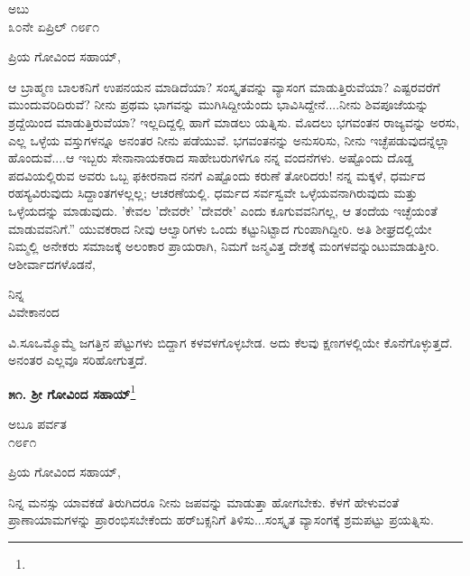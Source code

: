 \vspace{-0.5cm}

\begin{flushright}
ಅಬು\\೩೦ನೇ ಏಪ್ರಿಲ್ ೧೮೯೧
\end{flushright}

\noindent
ಪ್ರಿಯ ಗೋವಿಂದ ಸಹಾಯ್,

ಆ ಬ್ರಾಹ್ಮಣ ಬಾಲಕನಿಗೆ ಉಪನಯನ ಮಾಡಿದೆಯಾ? ಸಂಸ್ಕೃತವನ್ನು ವ್ಯಾಸಂಗ ಮಾಡುತ್ತಿರುವೆಯಾ? ಎಷ್ಟರವರೆಗೆ ಮುಂದುವರಿದಿರುವೆ? ನೀನು ಪ್ರಥಮ ಭಾಗವನ್ನು ಮುಗಿಸಿದ್ದೀಯೆಂದು ಭಾವಿಸಿದ್ದೇನೆ....ನೀನು ಶಿವಪೂಜೆಯನ್ನು ಶ್ರದ್ದೆಯಿಂದ ಮಾಡುತ್ತಿರುವೆಯಾ? ಇಲ್ಲದಿದ್ದಲ್ಲಿ ಹಾಗೆ ಮಾಡಲು ಯತ್ನಿಸು. ಮೊದಲು ಭಗವಂತನ ರಾಜ್ಯವನ್ನು ಅರಸು, ಎಲ್ಲ ಒಳ್ಳೆಯ ವಸ್ತುಗಳನ್ನೂ ಅನಂತರ ನೀನು ಪಡೆಯುವೆ. ಭಗವಂತನನ್ನು ಅನುಸರಿಸು, ನೀನು ಇಚ್ಛೆಪಡುವುದನ್ನೆಲ್ಲಾ ಹೊಂದುವೆ....ಆ ಇಬ್ಬರು ಸೇನಾನಾಯಕರಾದ ಸಾಹೇಬರುಗಳಿಗೂ ನನ್ನ ವಂದನೆಗಳು. ಅಷ್ಟೊಂದು ದೊಡ್ಡ ಪದವಿಯಲ್ಲಿರುವ ಅವರು ಒಬ್ಬ ಫಕೀರನಾದ ನನಗೆ ಎಷ್ಟೊಂದು ಕರುಣೆ ತೋರಿದರು! ನನ್ನ ಮಕ್ಕಳೆ, ಧರ್ಮದ ರಹಸ್ಯವಿರುವುದು ಸಿದ್ದಾಂತಗಳಲ್ಲಲ್ಲ; ಆಚರಣೆಯಲ್ಲಿ. ಧರ್ಮದ ಸರ್ವಸ್ವವೇ ಒಳ್ಳೆಯವನಾಗಿರುವುದು ಮತ್ತು ಒಳ್ಳೆಯದನ್ನು ಮಾಡುವುದು. 'ಕೇವಲ 'ದೇವರೇ' 'ದೇವರೇ' ಎಂದು ಕೂಗುವವನಿಗಲ್ಲ, ಆ ತಂದೆಯ ಇಚ್ಛೆಯಂತೆ ಮಾಡುವವನಿಗೆ.” ಯುವಕರಾದ ನೀವು ಆಲ್ವಾರಿಗಳು ಒಂದು ಕಟ್ಟುನಿಟ್ಟಾದ ಗುಂಪಾಗಿದ್ದೀರಿ. ಅತಿ ಶೀಘ್ರದಲ್ಲಿಯೇ ನಿಮ್ಮಲ್ಲಿ ಅನೇಕರು ಸಮಾಜಕ್ಕೆ ಅಲಂಕಾರ ಪ್ರಾಯರಾಗಿ, ನಿಮಗೆ ಜನ್ಮವಿತ್ತ ದೇಶಕ್ಕೆ ಮಂಗಳವನ್ನುಂಟುಮಾಡುತ್ತೀರಿ. ಆಶೀರ್ವಾದಗಳೊಡನೆ,

\vspace{-0.5cm}

{\flushright
ನಿನ್ನ\\ವಿವೇಕಾನಂದ\par}

ವಿ.ಸೂ\enginline{-}ಒಮ್ಮೊಮ್ಮೆ ಜಗತ್ತಿನ ಪೆಟ್ಟುಗಳು ಬಿದ್ದಾಗ ಕಳವಳಗೊಳ್ಳಬೇಡ. ಅದು ಕೆಲವು ಕ್ಷಣಗಳಲ್ಲಿಯೇ ಕೊನೆಗೊಳ್ಳುತ್ತದೆ. ಅನಂತರ ಎಲ್ಲವೂ ಸರಿಹೋಗುತ್ತದೆ.

\begin{center}
\textbf{೫೧. ಶ‍್ರೀ ಗೋವಿಂದ ಸಹಾಯ್}\footnote{}
\end{center}

\vspace{-0.65cm}

\begin{flushright}
ಅಬೂ ಪರ್ವತ\\೧೮೯೧
\end{flushright}

\vspace{-0.55cm}

\noindent
ಪ್ರಿಯ ಗೋವಿಂದ ಸಹಾಯ್,

ನಿನ್ನ ಮನಸ್ಸು ಯಾವಕಡೆ ತಿರುಗಿದರೂ ನೀನು ಜಪವನ್ನು ಮಾಡುತ್ತಾ ಹೋಗಬೇಕು. ಕೆಳಗೆ ಹೇಳುವಂತೆ ಪ್ರಾಣಾಯಾಮಗಳನ್ನು ಪ್ರಾರಂಭಿಸಬೇಕೆಂದು ಹರ್‌ಬಕ್ಸನಿಗೆ ತಿಳಿಸು...ಸಂಸ್ಕೃತ ವ್ಯಾಸಂಗಕ್ಕೆ ಶ್ರಮಪಟ್ಟು ಪ್ರಯತ್ನಿಸು.

